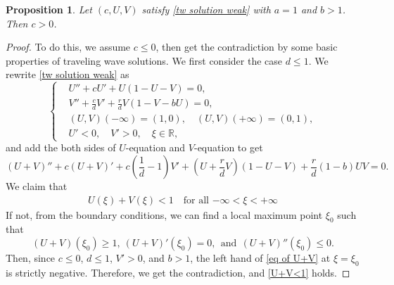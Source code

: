 \documentclass[11pt,a4paper]{article}
\newtheorem{proposition}[theorem]{\textbf{Proposition}}
\newtheorem{claim}[theorem]{\textbf{Claim}}
\numberwithin{equation}{section}
\numberwithin{figure}{section}
\newcommand\bea{\begin{eqnarray}}
\newcommand\eea{\end{eqnarray}}
\begin{document}
\begin{proposition}\label{prop: minimal tw speed c>0}
Let $(c,U,V)$ satisfy \eqref{tw solution weak} with $a=1$ and $b>1$. Then $c>0$.
\end{proposition}
\begin{proof} 
To do this, we assume $c\le 0$, then get the contradiction by some basic properties of traveling wave solutions. We first consider the case $d\le 1$.
We rewrite \eqref{tw solution weak} as 
\begin{equation*}
        \left\{
            \begin{aligned}
                &U''+cU'+U(1-U-V)=0,\\
                &V''+\frac{c}{d}V'+\frac{r}{d}V(1-V-bU)=0,\\
                &(U,V)(-\infty)=(1,0),\quad (U,V)(+\infty)=(0,1),\\
                &U'<0,\quad V'>0,\quad \xi\in\mathbb{R},
            \end{aligned}
            \right.
    \end{equation*}
and add the both sides of $U$-equation and $V$-equation to get
\begin{equation}\label{eq of U+V}
(U+V)''+c(U+V)'+c(\frac{1}{d}-1)V'+(U+\frac{r}{d}V)(1-U-V)+\frac{r}{d}(1-b)UV=0.
\end{equation}
We claim that 
\bea\label{U+V<1}
U(\xi)+V(\xi)<1 \quad \mbox{for all $-\infty<\xi<+\infty$}
\eea
If not, from the boundary conditions, we can find a local maximum point $\xi_0$ such that 
$$(U+V)(\xi_0)\geq 1,\ (U+V)'(\xi_0)=0,\ \ \text{and}\ \ (U+V)''(\xi_0)\leq0.$$
Then, since $c\leq 0$, $d\le 1$, $V'>0$, and $b>1$, the left hand of \eqref{eq of U+V} at $\xi=\xi_0$ is strictly negative. Therefore, we get the contradiction, and \eqref{U+V<1} holds.



\end{proof}
\end{document}
